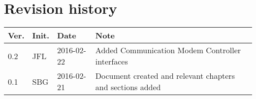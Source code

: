 \label{chp_revisionHistory}
\chapter*{Revision history}

\begin{tabular}{b{1cm} b{1cm} b{2cm} b{8cm}}
	\textbf{Ver.} & \textbf{Init.} & \textbf{Date} & \textbf{Note}\\
	\hline
	0.2 & JFL & 2016-02-22 & Added Communication Modem Controller interfaces \\
    0.1 & SBG & 2016-02-21 & Document created and relevant chapters and sections added \\
\end{tabular}

